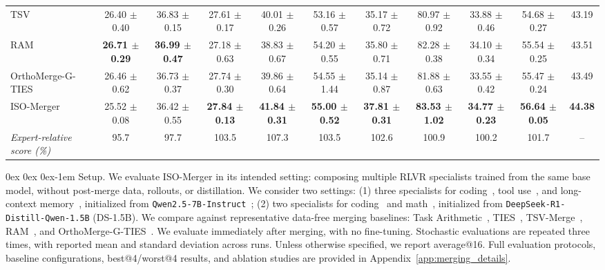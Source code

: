 \documentclass[11pt, a4paper]{utda}
\makeatletter
\renewcommand{\paragraph}{%
  \@startsection{paragraph}{4}%
  {\z@}{0ex \@plus 0ex \@minus 0ex}{-1em}%
  {\normalfont\normalsize\bfseries}%
}
\theoremstyle{plain}
\theoremstyle{definition}
\theoremstyle{remark}
\makeatother
\begin{document}
\begin{table}[ht]
{\begin{tabular}{lcccccccccc}
TSV~\cite{tsv} & 26.40 $\pm$ 0.40 & 36.83 $\pm$ 0.15 & 27.61 $\pm$ 0.17 & 40.01 $\pm$ 0.26 & 53.16 $\pm$ 0.57 & 35.17 $\pm$ 0.72 & 80.97 $\pm$ 0.92 & 33.88 $\pm$ 0.46 & 54.68 $\pm$ 0.27 & 43.19 \\
RAM~\cite{ram} & \textbf{26.71 $\pm$ 0.29} & \textbf{36.99 $\pm$ 0.47} & 27.18 $\pm$ 0.63 & 38.83 $\pm$ 0.67 & 54.20 $\pm$ 0.55 & 35.80 $\pm$ 0.71 & 82.28 $\pm$ 0.38 & 34.10 $\pm$ 0.34 & 55.54 $\pm$ 0.25 & 43.51 \\
OrthoMerge-G-TIES~\cite{yang2026orthogonal}  & 26.46 $\pm$ 0.62 & 36.73 $\pm$ 0.37 & 27.74 $\pm$ 0.30 & 39.86 $\pm$ 0.64  & 54.55 $\pm$ 1.44 & 35.14 $\pm$ 0.87 & 81.88 $\pm$ 0.63 & 33.55 $\pm$ 0.42 & 55.47 $\pm$ 0.24 &  43.49 \\
\midrule
\rowcolor{ourcolor}ISO-Merger & 25.52 $\pm$ 0.08 & 36.42 $\pm$ 0.55 & \textbf{27.84 $\pm$ 0.13} & \textbf{41.84 $\pm$ 0.31} & \textbf{55.00 $\pm$ 0.52} & \textbf{37.81 $\pm$ 0.31} & \textbf{83.53 $\pm$ 1.02} & \textbf{34.77 $\pm$ 0.23} & \textbf{56.64 $\pm$ 0.05} & \textbf{44.38} \\
\rowcolor{ourcolor}
\quad\textit{Expert-relative score (\%)} & 95.7 & 97.7 & 103.5 & 107.3 & 103.5 & 102.6 & 100.9 & 100.2 & 101.7 & -- \\
\bottomrule
\end{tabular}
}
\end{table}

\paragraph{Setup.}
We evaluate ISO-Merger in its intended setting: composing multiple RLVR specialists trained from the same base model, without
post-merge data, rollouts, or distillation.
We consider two settings:
(1) three specialists for coding~\cite{wang2025code},
tool use~\cite{qian2025toolrl}, and long-context
memory~\cite{yu2025memagent}, initialized from
\texttt{Qwen2.5-7B-Instruct}~\cite{qwen2.5};
(2) two specialists for coding~\cite{archer} and
math~\cite{he2025justrl}, initialized from
\texttt{DeepSeek-R1-Distill-Qwen-1.5B} (DS-1.5B).
We compare against representative data-free merging baselines:
Task Arithmetic~\cite{ta}, TIES~\cite{ties},
TSV-Merge~\cite{tsv}, RAM~\cite{ram}, and
OrthoMerge-G-TIES~\cite{yang2026orthogonal}.
We evaluate immediately after merging, with no fine-tuning. Stochastic evaluations are repeated three times, with reported mean and standard deviation across runs. Unless otherwise specified, we report average@16.
Full evaluation protocols, baseline configurations, best@4/worst@4 results, and ablation studies are provided in
Appendix~\ref{app:merging_details}.
\end{document}
